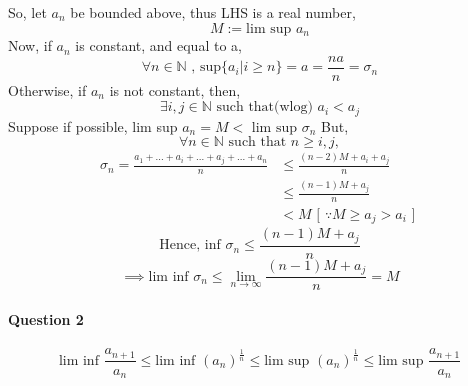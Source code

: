 \documentclass[20pt]{extarticle} %
\begin{document}
\begin{enumerate}[label=\Roman*]
		So, let $a_n$ be bounded above, thus LHS is a real number,
		\[ M:= \text{lim sup }a_n \]
		Now, if $a_n$ is constant, and equal to a,
		\[ \forall n \in \mathbb{N} \text{ , sup} \{ a_i | i\geq n \} =a = \frac{na}{n} =\sigma_n\]
		Otherwise, if $a_n$ is not constant, then,
		\[ \exists i,j \in \mathbb{N} \text { such that(wlog) } a_i < a_j \]
		Suppose if possible, lim sup $a_n=M< \text{ lim sup } \sigma_n$
		But, \[ \forall n \in \mathbb{N} \text{ such that } n \geq i,j, \]
		\begin{equation*}
			\begin{split}
				\sigma_n= \frac{a_1 + ... +a_i +...+ a_j + ... + a_n}{n} & \leq{\frac{(n-2)M+a_i+a_j}{n}}\\
										    & \leq \frac{(n-1)M+a_j}{n}\\
										    & <M \text{ [ $\because M \geq a_j > a_i $ ] }
			\end{split}
		\end{equation*}
		\[	\text{Hence, inf } \sigma_n \leq \frac{(n-1)M+a_j}{n} \]
		\[		\implies \text{lim inf } \sigma_n \leq \lim_{n \to \infty} \frac{(n-1)M+a_j}{n}=M\]
\end{enumerate}

\paragraph{Question 2}
\[ \text{lim inf } \frac{a_{n+1}}{a_n} \leq \text{lim inf }(a_n)^\frac{1}{n} \leq \text{lim sup }(a_n)^\frac{1}{n} \leq \text{lim sup }\frac{a_{n+1}}{a_n} \]
\end{document}
